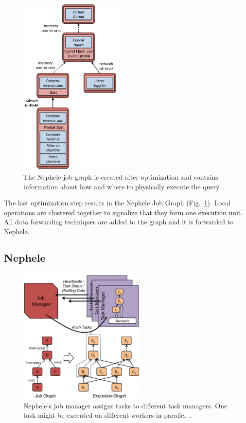 \begin{figure}[!t]
\centering
\includegraphics[width=2in]{./img/NepheleDAG.png}
\caption{The Nephele job graph is created after optimization and contains information about how and where to physically execute the query~\cite{Stratosphere2014}.}
\label{fig_stratosphere_nephele_dag}
\end{figure}

The last optimization step results in the Nephele Job Graph (Fig.~\ref{fig_stratosphere_nephele_dag}). Local operations are clustered together to signalize that they form one execution unit. All data forwarding techniques are added to the graph and it is forwarded to Nephele.

\subsection{Nephele}\label{straotsphereNephele}

\begin{figure}[!t]
\centering
\includegraphics[width=2.5in]{./img/NepheleMasterWorker.png}
\caption{Nephele's job manager assigns tasks to different task managers. One task might be executed on different workers in parallel~\cite{Stratosphere2014}.}
\label{fig_stratosphere_nephele_master_worker}
\end{figure}

